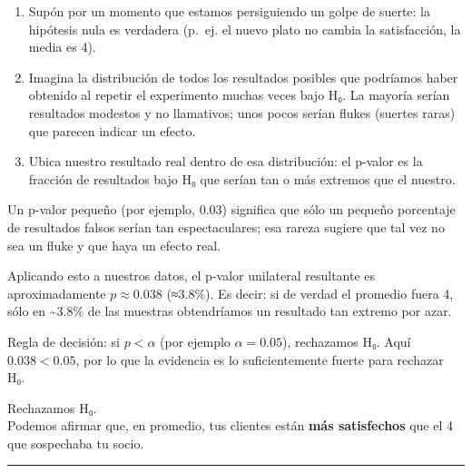 \documentclass[
  spanish,
  letterpaper,
  DIV=11,
  numbers=noendperiod]{scrreprt}
\providecommand{\tightlist}{%
  \setlength{\itemsep}{0pt}\setlength{\parskip}{0pt}}
\begin{document}
\begin{enumerate}
\def\labelenumi{\arabic{enumi}.}
\tightlist
\item
  Supón por un momento que estamos persiguiendo un golpe de suerte: la
  hipótesis nula es verdadera (p.~ej. el nuevo plato no cambia la
  satisfacción, la media es 4).
\item
  Imagina la distribución de todos los resultados posibles que podríamos
  haber obtenido al repetir el experimento muchas veces bajo H₀. La
  mayoría serían resultados modestos y no llamativos; unos pocos serían
  flukes (suertes raras) que parecen indicar un efecto.
\item
  Ubica nuestro resultado real dentro de esa distribución: el p-valor es
  la fracción de resultados bajo H₀ que serían tan o más extremos que el
  nuestro.
\end{enumerate}

Un p-valor pequeño (por ejemplo, 0.03) significa que sólo un pequeño
porcentaje de resultados falsos serían tan espectaculares; esa rareza
sugiere que tal vez no sea un fluke y que haya un efecto real.

Aplicando esto a nuestros datos, el p-valor unilateral resultante es
aproximadamente \(p \approx 0.038\) (≈3.8\%). Es decir: si de verdad el
promedio fuera 4, sólo en \textasciitilde3.8\% de las muestras
obtendríamos un resultado tan extremo por azar.

Regla de decisión: si \(p < \alpha\) (por ejemplo \(\alpha=0.05\)),
rechazamos H₀. Aquí \(0.038 < 0.05\), por lo que la evidencia es lo
suficientemente fuerte para rechazar H₀.

\begin{tcolorbox}[enhanced jigsaw, toptitle=1mm, opacitybacktitle=0.6, leftrule=.75mm, arc=.35mm, title=\textcolor{quarto-callout-tip-color}{\faLightbulb}\hspace{0.5em}{Veredicto}, colback=white, bottomrule=.15mm, colbacktitle=quarto-callout-tip-color!10!white, opacityback=0, bottomtitle=1mm, breakable, rightrule=.15mm, coltitle=black, left=2mm, titlerule=0mm, colframe=quarto-callout-tip-color-frame, toprule=.15mm]

Rechazamos H₀.\\
Podemos afirmar que, en promedio, tus clientes están \textbf{más
satisfechos} que el 4 que sospechaba tu socio.

\end{tcolorbox}

\begin{center}\rule{0.5\linewidth}{0.5pt}\end{center}
\end{document}
